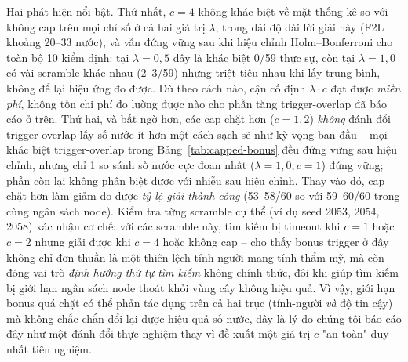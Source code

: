 \documentclass[10pt,conference]{article}
\begin{document}
Hai phát hiện nổi bật. Thứ nhất, $c=4$ không khác biệt về mặt thống kê
so với không cap trên mọi chỉ số ở cả hai giá trị $\lambda$, trong dải
độ dài lời giải này (F2L khoảng 20--33 nước), và vẫn đứng vững sau khi
hiệu chỉnh Holm--Bonferroni cho toàn bộ 10 kiểm định: tại $\lambda=0,5$
đây là khác biệt 0/59 thực sự, còn tại $\lambda=1,0$ có vài scramble
khác nhau (2--3/59) nhưng triệt tiêu nhau khi lấy trung bình, không để
lại hiệu ứng đo được. Dù theo cách nào, cận cố định $\lambda \cdot c$
đạt được \emph{miễn phí}, không tốn chi phí đo lường được nào cho phần
tăng trigger-overlap đã báo cáo ở trên. Thứ hai, và bất ngờ hơn, các
cap chặt hơn ($c=1,2$) \emph{không} đánh đổi trigger-overlap lấy số
nước ít hơn một cách sạch sẽ như kỳ vọng ban đầu -- mọi khác biệt
trigger-overlap trong Bảng~\ref{tab:capped-bonus} đều đứng vững sau
hiệu chỉnh, nhưng chỉ 1 so sánh số nước cực đoan nhất
($\lambda=1,0,c=1$) đứng vững; phần còn lại không phân biệt được với
nhiễu sau hiệu chỉnh. Thay vào đó, cap chặt hơn làm giảm đo được
\emph{tỷ lệ giải thành công} (53--58/60 so với 59--60/60 trong cùng
ngân sách node). Kiểm tra từng scramble cụ thể (ví dụ seed 2053, 2054,
2058) xác nhận cơ chế: với các scramble này, tìm kiếm bị timeout khi
$c=1$ hoặc $c=2$ nhưng giải được khi $c=4$ hoặc không cap -- cho thấy
bonus trigger ở đây không chỉ đơn thuần là một thiên lệch tính-người
mang tính thẩm mỹ, mà còn đóng vai trò \emph{định hướng thứ tự tìm
kiếm} không chính thức, đôi khi giúp tìm kiếm bị giới hạn ngân sách
node thoát khỏi vùng cây không hiệu quả. Vì vậy, giới hạn bonus quá
chặt có thể phản tác dụng trên cả hai trục (tính-người \emph{và} độ
tin cậy) mà không chắc chắn đổi lại được hiệu quả số nước, đây là lý
do chúng tôi báo cáo đây như một đánh đổi thực nghiệm thay vì đề xuất
một giá trị $c$ "an toàn" duy nhất tiên nghiệm.
\end{document}
